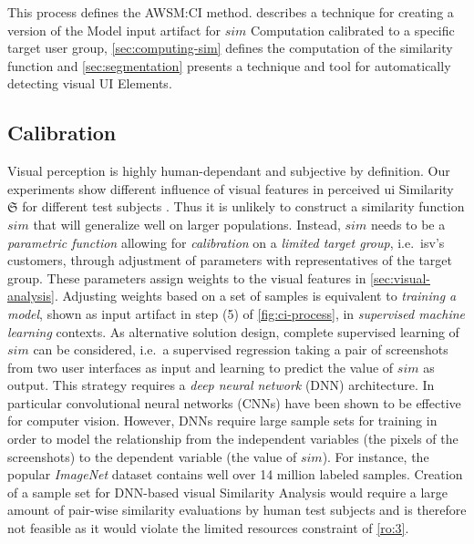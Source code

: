 This process defines the AWSM:CI method.
 describes a technique for creating a version of the Model input artifact for \(sim\) Computation calibrated to a specific target user group, \cref{sec:computing-sim} defines the computation of the similarity function and \cref{sec:segmentation} presents a technique and tool for automatically detecting visual UI Elements.

\vspace{-15pt}
\hypertarget{sec:calibration}{%
\subsection{Calibration}\label{sec:calibration}}
\vspace{5pt}

Visual perception is highly human-dependant and subjective by definition.
Our experiments show different influence of visual features in perceived \gls{ui} Similarity \(\mathfrak{S}\) for different test subjects \autocite{Bakaev2018APEIE,Bakaev2017Kansei}.
Thus it is unlikely to construct a similarity function \(sim\) that will generalize well on larger populations.
Instead, \(sim\) needs to be a \emph{parametric function} allowing for \emph{calibration} on a \emph{limited target group}, i.e.~\gls{isv}'s customers, through adjustment of parameters with representatives of the target group.
These parameters assign weights to the visual features in \cref{sec:visual-analysis}.
Adjusting weights based on a set of samples is equivalent to \emph{training a model}, shown as input artifact in step (5) of \cref{fig:ci-process}, in \emph{supervised machine learning} contexts.
As alternative solution design, complete supervised learning of \(sim\) can be considered, i.e.~a supervised regression taking a pair of screenshots from two user interfaces as input and learning to predict the value of \(sim\) as output.
This strategy requires a \emph{deep neural network} (DNN) architecture. 
In particular convolutional neural networks (CNNs) have been shown to be effective for computer vision.
However, DNNs require large sample sets for training \autocite{Liu2017DNNSurvey} in order to model the relationship from the independent variables (the pixels of the screenshots) to the dependent variable (the value of \(sim\)).
For instance, the popular \emph{ImageNet} dataset \autocite{Deng2009} contains well over 14 million labeled samples.
Creation of a sample set for DNN-based visual Similarity Analysis would require a large amount of pair-wise similarity evaluations by human test subjects and is therefore not feasible as it would violate the limited resources constraint of \cref{ro:3}.

